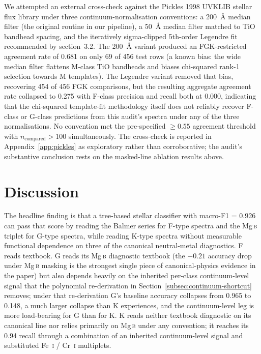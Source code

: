 \documentclass[11pt,a4paper]{article}
\newcommand{\Mgb}{Mg\,\textsc{b}\xspace}
\begin{document}
We attempted an external cross-check against the Pickles 1998 UVKLIB stellar flux library \citep{1998PASP..110..863P} under three continuum-normalisation conventions: a 200~\AA{} median filter (the original routine in our pipeline), a 50~\AA{} median filter matched to TiO bandhead spacing, and the iteratively sigma-clipped 5th-order Legendre fit recommended by \citet{1998PASP..110..863P} section~3.2. The 200~\AA{} variant produced an FGK-restricted agreement rate of 0.681 on only 69 of 456 test rows (a known bias: the wide median filter flattens M-class TiO bandheads and biases chi-squared rank-1 selection towards M templates). The Legendre variant removed that bias, recovering 454 of 456 FGK comparisons, but the resulting aggregate agreement rate collapsed to 0.275 with F-class precision and recall both at 0.000, indicating that the chi-squared template-fit methodology itself does not reliably recover F-class or G-class predictions from this audit's spectra under any of the three normalisations. No convention met the pre-specified $\geq 0.55$ agreement threshold with $n_{\mathrm{compared}} > 100$ simultaneously. The cross-check is reported in Appendix~\ref{app:pickles} as exploratory rather than corroborative; the audit's substantive conclusion rests on the masked-line ablation results above.

\section{Discussion}
\label{sec:discussion}

The headline finding is that a tree-based stellar classifier with macro-F1 = 0.926 can pass that score by reading the Balmer series for F-type spectra and the \Mgb triplet for G-type spectra, while reading K-type spectra without measurable functional dependence on three of the canonical neutral-metal diagnostics. F reads textbook. G reads its \Mgb diagnostic textbook (the $-0.21$ accuracy drop under \Mgb masking is the strongest single piece of canonical-physics evidence in the paper) but also depends heavily on the inherited per-class continuum-level signal that the polynomial re-derivation in Section~\ref{subsec:continuum-shortcut} removes; under that re-derivation G's baseline accuracy collapses from 0.965 to 0.148, a much larger collapse than K experiences, and the continuum-level leg is more load-bearing for G than for K. K reads neither textbook diagnostic on its canonical line nor relies primarily on \Mgb under any convention; it reaches its 0.94 recall through a combination of an inherited continuum-level signal and substituted Fe~\textsc{i} / Cr~\textsc{i} multiplets.
\end{document}
